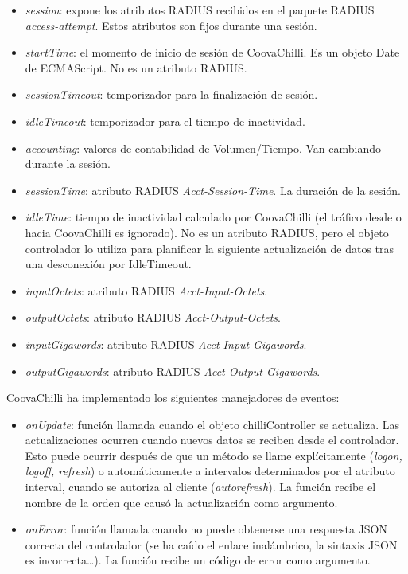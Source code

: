 \begin{itemize}
\item \emph{session}: expone los atributos RADIUS recibidos en el paquete RADIUS \emph{access-attempt}. Estos atributos son fijos durante una sesión.
\item \emph{startTime}: el momento de inicio de sesión de CoovaChilli. Es un objeto Date de ECMAScript. No es un atributo RADIUS.
\item \emph{sessionTimeout}: temporizador para la finalización de sesión.
\item \emph{idleTimeout}: temporizador para el tiempo de inactividad.
\item \emph{accounting}: valores de contabilidad de Volumen/Tiempo. Van cambiando durante la sesión.
\item \emph{sessionTime}: atributo RADIUS \emph{Acct-Session-Time}. La duración de la sesión.
\item \emph{idleTime}: tiempo de inactividad calculado por CoovaChilli (el tráfico desde o hacia CoovaChilli es ignorado). No es un atributo RADIUS, pero el objeto controlador lo utiliza para planificar la siguiente actualización de datos tras una desconexión por IdleTimeout.
\item \emph{inputOctets}: atributo RADIUS \emph{Acct-Input-Octets}.
\item \emph{outputOctets}: atributo RADIUS \emph{Acct-Output-Octets}.
\item \emph{inputGigawords}: atributo RADIUS \emph{Acct-Input-Gigawords}.
\item \emph{outputGigawords}: atributo RADIUS \emph{Acct-Output-Gigawords}.
\end{itemize}

CoovaChilli ha implementado los siguientes manejadores de eventos:

\begin{itemize}
\item \emph{onUpdate}: función llamada cuando el objeto chilliController se actualiza. Las actualizaciones ocurren cuando nuevos datos se reciben desde el controlador. Esto puede ocurrir después de que un método se llame explícitamente (\emph{logon, logoff, refresh}) o automáticamente a intervalos determinados por el atributo interval, cuando se autoriza al cliente (\emph{autorefresh}). La función recibe el nombre de la orden que causó la actualización como argumento.
\item \emph{onError}: función llamada cuando no puede obtenerse una respuesta JSON correcta del controlador (se ha caído el enlace inalámbrico, la sintaxis JSON es incorrecta…). La función recibe un código de error como argumento.
\end{itemize}

